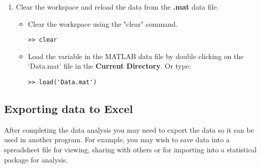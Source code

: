 \documentclass[12pt,a4paper]{article}
\begin{document}
\begin{enumerate}
	\item Clear the workspace and reload the data from the \textbf{.mat} data file.
	\begin{itemize}	
		\item Clear the workspace using the "clear" command.
		\begin{lstlisting}[style=Matlab-editor]
>> clear
		\end{lstlisting}
		\item Load the variable in the MATLAB data file by double clicking on the `Data.mat' file in the \textbf{Current Directory}. Or type:
		\begin{lstlisting}[style=Matlab-editor]
>> load('Data.mat') 
		\end{lstlisting}
	\end{itemize}
\end{enumerate}

\subsection{Exporting data to Excel}
After completing the data analysis you may need to export the data so it can be used in another program.  
For example, you may wish to save data into a spreadsheet file for viewing, sharing with others or for importing into a statistical package for analysis.
\end{document}

